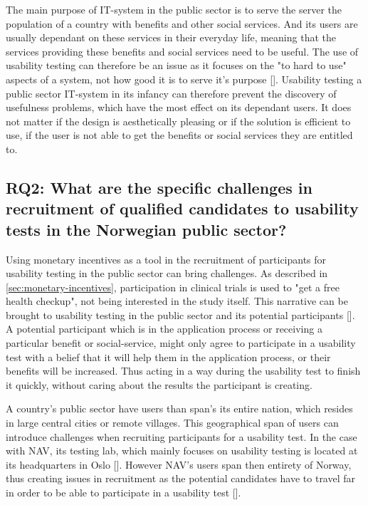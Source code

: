 The main purpose of IT-system in the public sector is to serve the server the population of a country with benefits and other social services. And its users are usually dependant on these services in their everyday life, meaning that the services providing these benefits and social services need to be useful. The use of usability testing can therefore be an issue as it focuses on the "to hard to use" aspects of a system, not how good it is to serve it's purpose [\cite{sg_2008}]. Usability testing a public sector IT-system in its infancy can therefore prevent the discovery of usefulness problems, which have the most effect on its dependant users. It does not matter if the design is aesthetically pleasing or if the solution is efficient to use, if the user is not able to get the benefits or social services they are entitled to.

\subsection{RQ2: What are the specific challenges in recruitment of qualified candidates to usability tests in the Norwegian public sector?}
Using monetary incentives as a tool in the recruitment of participants for usability testing in the public sector can bring challenges. As described in \autoref{sec:monetary-incentives}, participation in clinical trials is used to "get a free health checkup", not being interested in the study itself. This narrative can be brought to usability testing in the public sector and its potential participants [\cite{nc_2020}]. A potential participant which is in the application process or receiving a particular benefit or social-service, might only agree to participate in a usability test with a belief that it will help them in the application process, or their benefits will be increased. Thus acting in a way during the usability test to finish it quickly, without caring about the results the participant is creating.

A country's public sector have users than span's its entire nation, which resides in large central cities or remote villages. This geographical span of users can introduce challenges when recruiting participants for a usability test. In the case with NAV, its testing lab, which mainly focuses on usability testing is located at its headquarters in Oslo [\cite{sk_2022}]. However NAV's users span then entirety of Norway, thus creating issues in recruitment as the potential candidates have to travel far in order to be able to participate in a usability test [\cite{pkf_2018}].

